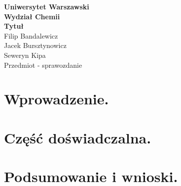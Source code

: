 \documentclass{sewClass}
\begin{document}
	
	\begin{titlepage}
		
		\begin{center}
			
			\Huge \textbf{Uniwersytet Warszawski \\ Wydział Chemii} \\[3cm]
			\Huge \textbf{Tytuł}
			\\[3cm]
			\Large  Filip Bandalewicz \\ Jacek Bursztynowicz \\ Seweryn Kipa
			\\[11.5cm]
			\Large Przedmiot - sprawozdanie
			
		\end{center}
		
	\end{titlepage}
	
	\section{Wprowadzenie.}
	\section {Część doświadczalna.}
	\section{Podsumowanie i wnioski.}
		
\end{document}
